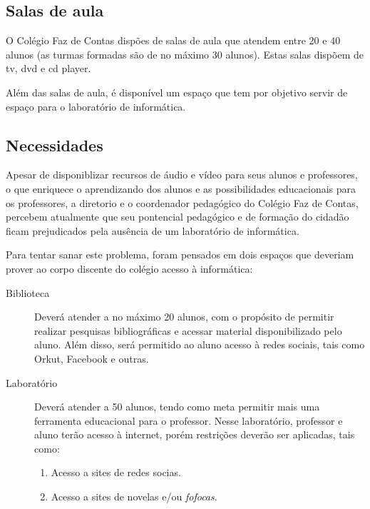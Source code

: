 \documentclass[a4paper,12pt]{report}
\begin{document}
            \subsection{Salas de aula}
            O Colégio Faz de Contas dispões de salas de aula que atendem entre
            20 e 40 alunos (as turmas formadas são de no máximo 30 alunos).
            Estas salas dispõem de tv, dvd e cd player.

            Além das salas de aula, é disponível um espaço que tem por
            objetivo servir de espaço para o laboratório de informática.

            \subsection{Necessidades}
            Apesar de disponiblizar recursos de áudio e vídeo para seus alunos e
            professores, o que enriquece o aprendizando dos alunos e as
            possibilidades educacionais para os professores, a diretorio e o
            coordenador pedagógico do Colégio Faz de Contas, percebem atualmente
            que seu pontencial pedagógico e de formação do cidadão ficam
            prejudicados pela ausência de um laboratório de informática.

            Para tentar sanar este problema, foram pensados em dois espaços que
            deveriam prover ao corpo discente do colégio acesso à informática:

            \begin{description}

                \item[Biblioteca] Deverá atender a no máximo 20 alunos, com o
                propósito de permitir realizar pesquisas bibliográficas e
                acessar material disponibilizado pelo aluno. Além disso, será
                permitido ao aluno acesso à redes sociais, tais como Orkut,
                Facebook e outras.

                \item[Laboratório] Deverá atender a 50 alunos, tendo como meta
                permitir mais uma ferramenta educacional para o professor. Nesse
                laboratório, professor e aluno terão acesso à internet, porém
                restrições deverão ser aplicadas, tais como:

                \begin{enumerate}

                    \item Acesso a sites de redes socias.

                    \item Acesso a sites de novelas e/ou \emph{fofocas}.

                \end{enumerate}

            \end{description}
\end{document}
